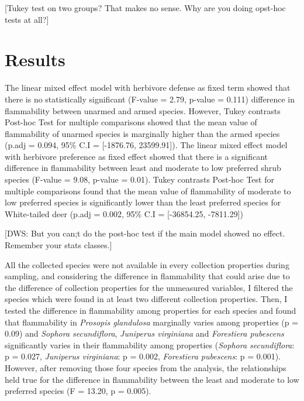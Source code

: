 \documentclass{ttuthes2007}
\begin{document}
[Tukey test on two groups? That makes no sense. Why are you doing opst-hoc tests at all?]

\section{Results}

The linear mixed effect model with herbivore defense as fixed term showed that there is no statistically significant (F-value = 2.79, p-value = 0.111) difference in flammability between unarmed and armed species. However, Tukey contrasts Post-hoc Test for multiple comparisons showed that the mean value of flammability of unarmed species is marginally higher than the armed species (p.adj = 0.094, 95\% C.I = [-1876.76, 23599.91]). The linear mixed effect model with herbivore preference as fixed effect showed that there is a significant difference in flammability between least and moderate to low preferred shrub species (F-value = 9.08, p-value = 0.01). Tukey contrasts Post-hoc Test for multiple comparisons found that the mean value of flammability of moderate to low  preferred species is significantly lower than the least preferred species for White-tailed deer (p.adj = 0.002, 95\% C.I = [-36854.25, -7811.29])

[DWS: But you can;t do the post-hoc test if the main model showed no effect. Remember your stats classes.]



All the collected species were not available in every collection properties during sampling, and considering the difference in flammability that could arise due to the difference of collection properties for the unmeasured variables, I filtered the species which were found in at least two different collection properties. Then, I tested the difference in flammability among properties for each species and found that flammability in \emph{Prosopis glandulosa} marginally varies among properties (p = 0.09) and \emph{Sophora secundiflora}, \emph{Juniperus virginiana} and \emph{Forestiera pubescens} significantly varies in their flammability among properties (\emph{Sophora secundiflora}: p = 0.027, \emph{Juniperus virginiana}: p = 0.002, \emph{Forestiera pubescens}: p = 0.001). However, after removing those four species from the analysis, the relationships held true for the difference in flammability between the least and moderate to low preferred species (F = 13.20, p = 0.005).
\end{document}
